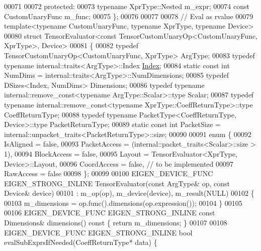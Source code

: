 \begin{DoxyCode}
00071 
00072   \textcolor{keyword}{protected}:
00073     \textcolor{keyword}{typename} XprType::Nested m\_expr;
00074     \textcolor{keyword}{const} CustomUnaryFunc m\_func;
00075 \};
00076 
00077 
00078 \textcolor{comment}{// Eval as rvalue}
00079 \textcolor{keyword}{template}<\textcolor{keyword}{typename} CustomUnaryFunc, \textcolor{keyword}{typename} XprType, \textcolor{keyword}{typename} Device>
00080 \textcolor{keyword}{struct }TensorEvaluator<const TensorCustomUnaryOp<CustomUnaryFunc, XprType>, Device>
00081 \{
00082   \textcolor{keyword}{typedef} TensorCustomUnaryOp<CustomUnaryFunc, XprType> ArgType;
00083   \textcolor{keyword}{typedef} \textcolor{keyword}{typename} internal::traits<ArgType>::Index \hyperlink{namespace_eigen_a62e77e0933482dafde8fe197d9a2cfde}{Index};
00084   \textcolor{keyword}{static} \textcolor{keyword}{const} \textcolor{keywordtype}{int} NumDims = internal::traits<ArgType>::NumDimensions;
00085   \textcolor{keyword}{typedef} DSizes<Index, NumDims> Dimensions;
00086   \textcolor{keyword}{typedef} \textcolor{keyword}{typename} internal::remove\_const<typename ArgType::Scalar>::type Scalar;
00087   \textcolor{keyword}{typedef} \textcolor{keyword}{typename} internal::remove\_const<typename XprType::CoeffReturnType>::type CoeffReturnType;
00088   \textcolor{keyword}{typedef} \textcolor{keyword}{typename} PacketType<CoeffReturnType, Device>::type PacketReturnType;
00089   \textcolor{keyword}{static} \textcolor{keyword}{const} \textcolor{keywordtype}{int} PacketSize = internal::unpacket\_traits<PacketReturnType>::size;
00090 
00091   \textcolor{keyword}{enum} \{
00092     IsAligned = \textcolor{keyword}{false},
00093     PacketAccess = (internal::packet\_traits<Scalar>::size > 1),
00094     BlockAccess = \textcolor{keyword}{false},
00095     Layout = TensorEvaluator<XprType, Device>::Layout,
00096     CoordAccess = \textcolor{keyword}{false},  \textcolor{comment}{// to be implemented}
00097     RawAccess = \textcolor{keyword}{false}
00098   \};
00099 
00100   EIGEN\_DEVICE\_FUNC EIGEN\_STRONG\_INLINE TensorEvaluator(\textcolor{keyword}{const} ArgType& op, \textcolor{keyword}{const} Device& device)
00101       : m\_op(op), m\_device(device), m\_result(NULL)
00102   \{
00103     m\_dimensions = op.func().dimensions(op.expression());
00104   \}
00105 
00106   EIGEN\_DEVICE\_FUNC EIGEN\_STRONG\_INLINE \textcolor{keyword}{const} Dimensions& dimensions()\textcolor{keyword}{ const }\{ \textcolor{keywordflow}{return} m\_dimensions; \}
00107 
00108   EIGEN\_DEVICE\_FUNC EIGEN\_STRONG\_INLINE \textcolor{keywordtype}{bool} evalSubExprsIfNeeded(CoeffReturnType* data) \{

\end{DoxyCode}
